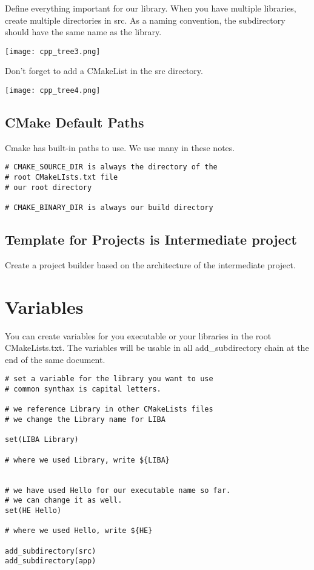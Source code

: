 Define everything important for our library. When you have multiple libraries, create multiple directories in
src. As a naming convention, the subdirectory should have the same name as the library.

\begin{center}
    \texttt{[image: cpp\_tree3.png]}
\end{center}

Don't forget to add a CMakeList in the src directory.


\begin{center}
    \texttt{[image: cpp\_tree4.png]}
\end{center}

\subsection{CMake Default Paths}

Cmake has built-in paths to use. We use many in these notes.

\begin{verbatim}
# CMAKE_SOURCE_DIR is always the directory of the
# root CMakeLIsts.txt file
# our root directory

# CMAKE_BINARY_DIR is always our build directory
\end{verbatim}



\subsection{Template for Projects is Intermediate project}

Create a project builder based on the architecture of the intermediate project.


\section{Variables}

You can create variables for you executable or your libraries in the root CMakeLists.txt. The variables
will be usable in all add\_subdirectory chain at the end of the same document.

\begin{verbatim}
# set a variable for the library you want to use
# common synthax is capital letters.

# we reference Library in other CMakeLists files
# we change the Library name for LIBA

set(LIBA Library)

# where we used Library, write ${LIBA}


# we have used Hello for our executable name so far.
# we can change it as well.
set(HE Hello)

# where we used Hello, write ${HE}

add_subdirectory(src)
add_subdirectory(app)
\end{verbatim}


